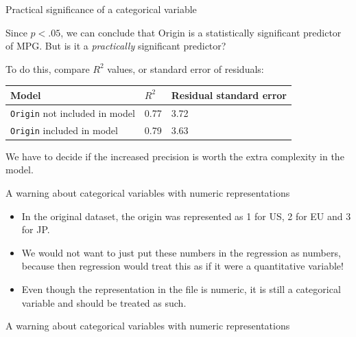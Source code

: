 \documentclass{beamer}\usepackage[]{graphicx}\usepackage[]{color}
\newenvironment{knitrout}{}{} %
\begin{document}
\begin{darkframes}
    \begin{frame}{Practical significance of a categorical variable}
      
      Since $p<.05$, we can conclude that Origin is a statistically significant predictor of MPG.
      But is it a \emph{practically} significant predictor?

      \bigskip\pause

      To do this, compare $R^2$ values, or standard error of residuals:

      \bigskip

      \begin{tabular}{lll}
      \textbf{Model} & \textbf{$R^2$} & \textbf{Residual standard error} \\
      \hline
      \texttt{Origin} not included in model & 0.77 & 3.72 \\
      \texttt{Origin} included in model & 0.79 & 3.63 \\
      \hline
      \end{tabular}

      \bigskip

      We have to decide if the increased precision is worth the extra complexity in the model.
    \end{frame}

    \begin{frame}[fragile]{A warning about categorical variables with numeric representations}
      \begin{itemize}[<+->]
        \item In the original dataset, the origin was represented as 1 for US, 2 for EU and 3 for JP.
        \item We would \alert{not} want to just put these numbers in the regression as numbers, because then regression would treat this as if it were a quantitative variable!
        \item Even though the representation in the file is numeric, it is still a categorical variable and should be treated as such.
      \end{itemize}
    \end{frame}

    \begin{frame}[fragile]{A warning about categorical variables with numeric representations}
\begin{knitrout}


\end{knitrout}
    \end{frame}
  \end{darkframes}
\end{document}
